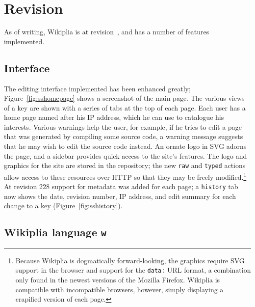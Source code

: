 \documentclass[twocolumn]{article}
\begin{document}
\section{Revision \currentrevision} \label{sec:current}

As of writing, Wikiplia is at revision~\currentrevision, and has
a number of features implemented.

\subsection{Interface}

The editing interface implemented has been enhanced greatly;
Figure~\ref{fig:sshomepage} shows a screenshot of the main page. The
various views of a key are shown with a series of tabs at the top of
each page. Each user has a home page named after his IP
address,\z{} which he can use to catalogue his
interests. Various warnings help the user, for example, if he tries to
edit a page that was generated by compiling some source code, a
warning message suggests that he may wish to edit the source code
instead. An ornate logo in SVG adorns
the page, and a sidebar provides quick access to the site's features.
The logo and graphics for the site are stored in the repository; the
new {\tt raw} and {\tt typed} actions allow access to these resources
over HTTP so that they may be freely modified.\z\footnote{Because
Wikiplia is dogmatically forward-looking, the graphics require SVG
support in the browser and support for the {\tt data:} URL format, a
combination only found in the newest versions of the Mozilla Firefox.
Wikiplia is compatible with incompatible browsers, however, simply
displaying a crapified version of each page.} At revision 228 support
for metadata was added for each page; a {\tt history} tab now shows
the date, revision number, IP address, and edit summary for each
change to a key (Figure~\ref{fig:sshistory}).


\subsection{Wikiplia language {\tt w}}
\end{document}
